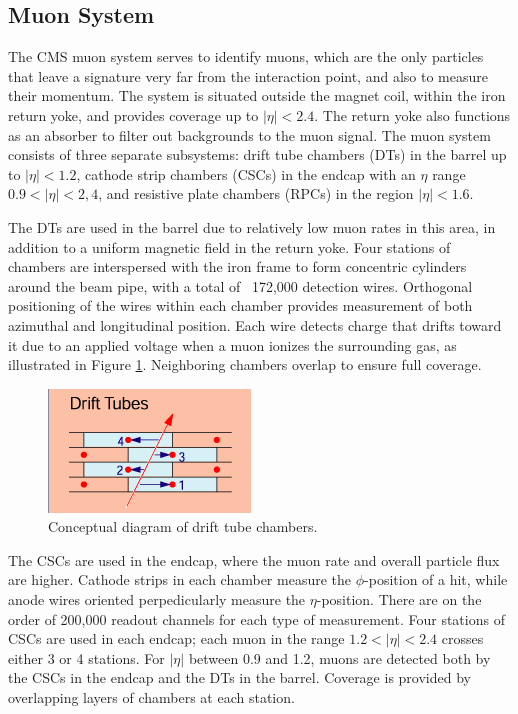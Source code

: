 \subsection{Muon System}
\label{exp:muons}
The CMS muon system serves to identify muons, 
which are the only particles that leave a signature 
very far from the interaction point,
and also to measure their momentum.  
The system is situated outside the magnet coil, 
within the iron return yoke, 
and provides coverage up to $|\eta| < 2.4$.  
The return yoke also functions as an absorber 
to filter out backgrounds to the muon signal.  
The muon system consists of three separate subsystems: 
drift tube chambers (DTs) in the barrel up to $|\eta| < 1.2$, 
cathode strip chambers (CSCs) in the endcap 
with an $\eta$ range $ 0.9 < |\eta| < 2,4$, 
and resistive plate chambers (RPCs) %
in the region $ |\eta| < 1.6$.  

The DTs are used in the barrel due to 
relatively low muon rates in this area, 
in addition to a uniform magnetic field in the 
return yoke.  
Four stations of chambers are interspersed 
with the iron frame to form
concentric cylinders around the beam pipe, 
with a total of ~172,000 detection wires.  
Orthogonal positioning of the wires 
within each chamber provides measurement of 
both azimuthal and longitudinal position.  
Each wire detects charge that drifts toward it 
due to an applied voltage when a muon ionizes 
the surrounding gas, as illustrated in 
Figure \ref{fig:DTconcept}.  
Neighboring chambers overlap 
to ensure full coverage.  

 \begin{figure}[htb]
  \begin{center}
    \includegraphics[]{Figures/muon-DT-concept.png}
  \end{center}
  \caption[\fixspacing Conceptual diagram of drift tube chambers]
	  {\fixspacing Conceptual diagram of drift tube chambers.}
  \label{fig:DTconcept}
 \end{figure}

The CSCs are used in the endcap, 
where the muon rate and overall particle flux 
are higher.  
Cathode strips in each chamber 
measure the $\phi$-position of a hit, 
while anode wires oriented perpedicularly measure 
the $\eta$-position.  
There are on the order of 200,000 readout channels 
for each type of measurement.  
Four stations of CSCs are used in each endcap; 
each muon in the range $1.2 < |\eta| <2.4$ crosses either 
3 or 4 stations.  
For $|\eta|$ between 0.9 and 1.2, muons are detected 
both by the CSCs in the endcap and the DTs in the barrel.  
Coverage is provided by overlapping layers of chambers 
at each station.  

